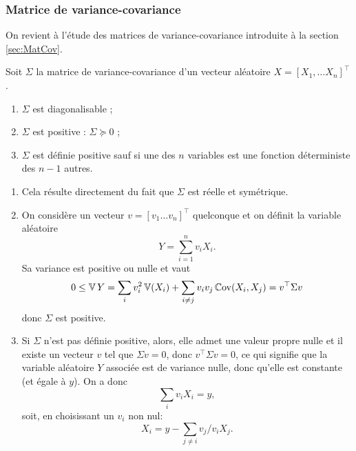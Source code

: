 \subsubsection{Matrice de variance-covariance}

On revient à l'étude des matrices de variance-covariance introduite à la section \ref{sec:MatCov}.

\begin{proposition}
  Soit $\Sigma$ la matrice de variance-covariance d'un vecteur aléatoire $X = [X_1, \dots X_n]^\top$.
  \begin{enumerate}
    \item $\Sigma$ est diagonalisable ;
    \item $\Sigma$ est positive : $\Sigma \succcurlyeq 0$ ;
    \item $\Sigma$ est définie positive sauf si une des $n$ variables est une fonction déterministe des $n-1$ autres.
  \end{enumerate}
\end{proposition}

\proof
\begin{enumerate}
\item Cela résulte directement du fait que $\Sigma$ est réelle et symétrique.
\item On considère un vecteur $v = [v_1 \dots v_n]^\top$ quelconque et on définit la variable aléatoire 
$$
Y = \sum_{i=1}^n v_i X_i.
$$
Sa variance est positive ou nulle et vaut
$$
0 \leq \operatorname{\mathbb{V}} Y 
= \sum_i v_i^2 \operatorname{\mathbb{V}}(X_i) + \sum_{i \neq j} v_i v_j \operatorname{\mathbb{C}ov}(X_i, X_j)
= v^\top \Sigma v
$$
donc $\Sigma$ est positive.
\item Si $\Sigma$  n'est pas définie positive, alors, elle admet une valeur propre nulle et il existe un vecteur $v$ tel que $\Sigma v = 0$, donc $v^\top \Sigma v = 0$, ce qui signifie que la variable aléatoire $Y$ associée est de variance nulle, donc qu'elle est constante (et égale à $y$). On a donc
$$
\sum_i v_i X_i = y,
$$
soit, en choisissant un $v_i$ non nul: 
$$
X_i = y - \sum_{j \neq i} v_j/v_i X_j.
$$
\end{enumerate}
\eproof

